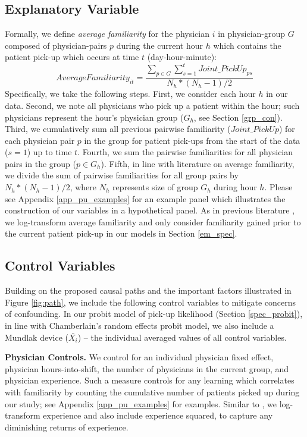  \subsection{Explanatory Variable}
 Formally, we define \textit{average familiarity} for the physician $i$ in physician-group $G$ composed of physician-pairs $p$ during the current hour $h$ which contains the patient pick-up which occurs at time $t$ (day-hour-minute):
 \begin{equation} \label{eq_fam}
     AverageFamiliarity_{it} = \frac{ \sum_{p \in G} \sum_{s=1}^t Joint\_PickUp_{ps} }{ N_h * (N_h-1)/2 }
 \end{equation}
 \noindent 
 Specifically, we take the following steps. First, we consider each hour $h$ in our data. Second, we note all physicians who pick up a patient within the hour; such physicians represent the hour’s physician group ($G_h$, see Section \ref{grp_con}). Third, we cumulatively sum all previous pairwise familiarity ($Joint\_PickUp$) for each physician pair $p$ in the group for patient pick-ups from the start of the data ($s=1$) up to time $t$. Fourth, we sum the pairwise familiarities for all physician pairs in the group ($p \in G_h$). Fifth, in line with literature on average familiarity, we divide the sum of pairwise familiarities for all group pairs by $N_h*(N_h-1)/2$, where $N_h$ represents size of group $G_h$ during hour $h$. Please see Appendix \ref{app_pu_examples} for an example panel which illustrates the construction of our variables in a hypothetical panel. As in previous literature \citep[e.g.,][]{Avgerinos2017}, we log-transform average familiarity and only consider familiarity gained prior to the current patient pick-up in our models in Section \ref{em_spec}.

 \subsection{Control Variables} \label{ctrl_vars}
 Building on the proposed causal paths and the important factors illustrated in Figure \ref{fig:path}, we include the following control variables to mitigate concerns of confounding. In our probit model of pick-up likelihood (Section \ref{spec_probit}), in line with Chamberlain’s random effects probit model, we also include a Mundlak device ($\bar{X_i}$) – the individual averaged values of all control variables.
 
 \noindent \textbf{Physician Controls.} We control for an individual physician fixed effect, physician hours-into-shift, the number of physicians in the current group, and physician experience. Such a measure controls for any learning which correlates with familiarity by counting the cumulative number of patients picked up during our study; see Appendix \ref{app_pu_examples} for examples. Similar to \cite{Reagans2005}, we log-transform experience and also include experience squared, to capture any diminishing returns of experience. 
 
